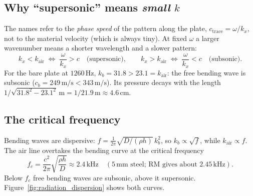 \subsection{Why ``supersonic'' means \emph{small} $k$}
The names refer to the \emph{phase speed} of the pattern along the plate,
$c_\mathrm{trace} = \omega/k_x$, not to the material velocity (which is always tiny).
At fixed $\omega$ a larger wavenumber means a shorter wavelength and a slower
pattern:
\begin{equation}
  k_x < k_\mathrm{air} \;\Longleftrightarrow\; \frac{\omega}{k_x} > c
  \quad\text{(supersonic)},
  \qquad
  k_x > k_\mathrm{air} \;\Longleftrightarrow\; \frac{\omega}{k_x} < c
  \quad\text{(subsonic)} .
\end{equation}
For the bare plate at $1260\,\mathrm{Hz}$, $k_b = 31.8 > 23.1 = k_\mathrm{air}$:
the free bending wave is subsonic ($c_b = 249\,\mathrm{m/s} < 343\,\mathrm{m/s}$).
Its pressure decays with the length
$1/\sqrt{31.8^2 - 23.1^2}\,\mathrm{m} = 1/21.9\,\mathrm{m} \approx 4.6\,\mathrm{cm}$.

\subsection{The critical frequency}
Bending waves are dispersive: $f = \frac{1}{2\pi}\sqrt{D/(\rho h)}\, k_b^2$, so
$k_b \propto \sqrt{f}$, while $k_\mathrm{air} \propto f$. The air line overtakes the
bending curve at the critical frequency
\begin{equation}
  f_c = \frac{c^2}{2\pi}\sqrt{\frac{\rho h}{D}} \approx 2.4\,\mathrm{kHz}
  \quad (5\,\mathrm{mm} \text{ steel; RM gives about } 2.45\,\mathrm{kHz}).
\end{equation}
Below $f_c$ free bending waves are subsonic, above it supersonic.
Figure~\ref{fig:radiation_dispersion} shows both curves.

